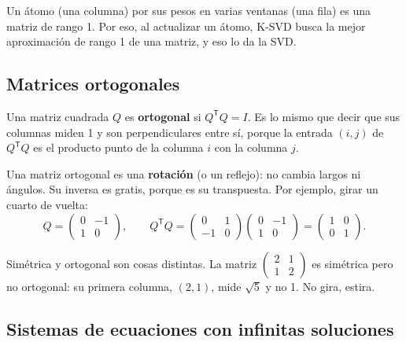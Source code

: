 \documentclass[11pt,letterpaper]{article}
\newcommand{\T}{^{\mathsf{T}}}
\newcommand{\raiz}[1]{\sqrt{#1}}
\begin{document}
\begin{idea}
    Un átomo (una columna) por sus pesos en varias ventanas (una fila)
    es una matriz de rango 1. Por eso, al actualizar un átomo, K-SVD
    busca la mejor aproximación de rango 1 de una matriz, y eso lo da
    la SVD.
\end{idea}

\subsection*{Matrices ortogonales}

\begin{definicion}
    Una matriz cuadrada $Q$ es \textbf{ortogonal} si $Q\T Q = I$. Es
    lo mismo que decir que sus columnas miden 1 y son perpendiculares
    entre sí, porque la entrada $(i,j)$ de $Q\T Q$ es el producto punto
    de la columna $i$ con la columna $j$.
\end{definicion}

Una matriz ortogonal es una \textbf{rotación} (o un reflejo): no
cambia largos ni ángulos. Su inversa es gratis, porque es su
transpuesta. Por ejemplo, girar un cuarto de vuelta:
\[
    Q = \begin{pmatrix} 0 & -1 \\ 1 & 0 \end{pmatrix},
    \qquad
    Q\T Q =
    \begin{pmatrix} 0 & 1 \\ -1 & 0 \end{pmatrix}
    \begin{pmatrix} 0 & -1 \\ 1 & 0 \end{pmatrix}
    = \begin{pmatrix} 1 & 0 \\ 0 & 1 \end{pmatrix} .
\]

\begin{ojo}
    Simétrica y ortogonal son cosas distintas. La matriz
    $\left(\begin{smallmatrix} 2 & 1 \\ 1 & 2 \end{smallmatrix}\right)$
    es simétrica pero no ortogonal: su primera columna, $(2, 1)$, mide
    $\raiz{5}$ y no 1. No gira, estira.
\end{ojo}

\subsection*{Sistemas de ecuaciones con infinitas soluciones}
\end{document}
